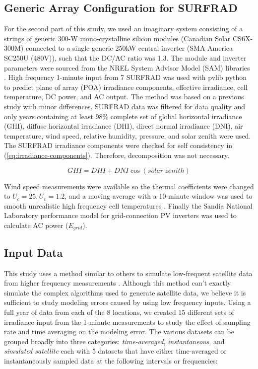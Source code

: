 \documentclass[conference]{IEEEtran}
\begin{document}
\subsection{Generic Array Configuration for SURFRAD}
For the second part of this study, we used an imaginary system consisting of a strings of generic 300-W mono-crystalline silicon modules (Canadian Solar CS6X-300M) connected to a single generic 250kW central inverter (SMA America SC250U (480V)), such that the DC/AC ratio was 1.3. The module and inverter parameters were sourced from the NREL System Advisor Model (SAM) libraries \cite{Freeman2018}. High frequency 1-minute input from 7 SURFRAD \cite{Augustine2000} was used with pvlib python \cite{pvlib2018} to predict plane of array (POA) irradiance components, effective irradiance, cell temperature, DC power, and AC output. The method was based on a previous study \cite{9519024} with minor differences. SURFRAD data was filtered for data quality and only years containing at least 98\% complete set of global horizontal irradiance (GHI), diffuse horizontal irradiance (DHI), direct normal irradiance (DNI), air temperature, wind speed, relative humidity, pressure, and solar zenith were used. The SURFRAD irradiance components were checked for self consistency in (\ref{eq:irradiance-components}). Therefore, decomposition was not necessary.

\begin{equation}
\mathit{GHI} = \mathit{DHI} + \mathit{DNI} \cos{\left(\mathit{solar\ zenith}\right)}
\label{eq:irradiance-components}
\end{equation}

Wind speed measurements were available so the thermal coefficients were changed to $U_c=25, U_v=1.2$, and a moving average with a 10-minute window was used to smooth unrealistic high frequency cell temperatures \cite{9095219}. Finally the Sandia National Laboratory performance model for grid-connection PV inverters \cite{King2007} was used to calculate AC power ($E_{grid}$).

\subsection{Input Data}
This study uses a method similar to others to simulate low-frequent satellite data from higher frequency measurements \cite{Bowersox2021}. Although this method can't exactly simulate the complex algorithms used to generate satellite data, we believe it is sufficient to study modeling errors caused by using low frequency inputs. Using a full year of data from each of the 8 locations, we created 15 different sets of irradiance input from the 1-minute measurements to study the effect of sampling rate and time averaging on the modeling error. The various datasets can be grouped broadly into three categories: \emph{time-averaged}, \emph{instantaneous}, and \emph{simulated satellite} each with 5 datasets that have either time-averaged or instantaneously sampled data at the following intervals or frequencies:
\end{document}
